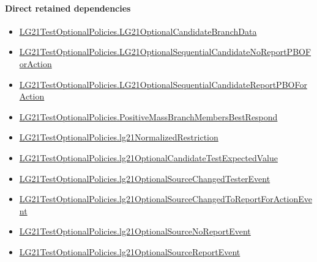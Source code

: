 \documentclass[10pt]{article}
\begin{document}
\paragraph{Direct retained dependencies}
\begin{itemize}\raggedright
\item \hyperlink{governing-declaration-5ca7587508e20c80}{LG21\allowbreak{}Test\allowbreak{}Optional\allowbreak{}Policies.\allowbreak{}LG21\allowbreak{}Optional\allowbreak{}Candidate\allowbreak{}Branch\allowbreak{}Data}
\item \hyperlink{governing-declaration-b550661df73af686}{LG21\allowbreak{}Test\allowbreak{}Optional\allowbreak{}Policies.\allowbreak{}LG21\allowbreak{}Optional\allowbreak{}Sequential\allowbreak{}Candidate\allowbreak{}No\allowbreak{}Report\allowbreak{}PBO\allowbreak{}For\allowbreak{}Action}
\item \hyperlink{governing-declaration-a089f4f431420012}{LG21\allowbreak{}Test\allowbreak{}Optional\allowbreak{}Policies.\allowbreak{}LG21\allowbreak{}Optional\allowbreak{}Sequential\allowbreak{}Candidate\allowbreak{}Report\allowbreak{}PBO\allowbreak{}For\allowbreak{}Action}
\item \hyperlink{governing-declaration-c88a4672ccb48271}{LG21\allowbreak{}Test\allowbreak{}Optional\allowbreak{}Policies.\allowbreak{}Positive\allowbreak{}Mass\allowbreak{}Branch\allowbreak{}Members\allowbreak{}Best\allowbreak{}Respond}
\item \hyperlink{governing-declaration-ee825e256b6d452b}{LG21\allowbreak{}Test\allowbreak{}Optional\allowbreak{}Policies.\allowbreak{}lg21\allowbreak{}Normalized\allowbreak{}Restriction}
\item \hyperlink{governing-declaration-d0454f59d5aac8fb}{LG21\allowbreak{}Test\allowbreak{}Optional\allowbreak{}Policies.\allowbreak{}lg21\allowbreak{}Optional\allowbreak{}Candidate\allowbreak{}Test\allowbreak{}Expected\allowbreak{}Value}
\item \hyperlink{governing-declaration-003cd819b19c31b9}{LG21\allowbreak{}Test\allowbreak{}Optional\allowbreak{}Policies.\allowbreak{}lg21\allowbreak{}Optional\allowbreak{}Source\allowbreak{}Changed\allowbreak{}Tester\allowbreak{}Event}
\item \hyperlink{governing-declaration-75dfdc87b5082e24}{LG21\allowbreak{}Test\allowbreak{}Optional\allowbreak{}Policies.\allowbreak{}lg21\allowbreak{}Optional\allowbreak{}Source\allowbreak{}Changed\allowbreak{}To\allowbreak{}Report\allowbreak{}For\allowbreak{}Action\allowbreak{}Event}
\item \hyperlink{governing-declaration-c3ec21db2b001bc5}{LG21\allowbreak{}Test\allowbreak{}Optional\allowbreak{}Policies.\allowbreak{}lg21\allowbreak{}Optional\allowbreak{}Source\allowbreak{}No\allowbreak{}Report\allowbreak{}Event}
\item \hyperlink{governing-declaration-32ed522573e310b6}{LG21\allowbreak{}Test\allowbreak{}Optional\allowbreak{}Policies.\allowbreak{}lg21\allowbreak{}Optional\allowbreak{}Source\allowbreak{}Report\allowbreak{}Event}
\end{itemize}
\hypertarget{governing-declaration-e89a7935abe7d3a9}{}
\end{document}
